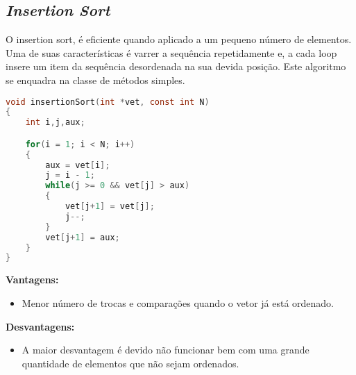 \documentclass[
	12pt,				%
	oneside,			%
	a4paper,			%
	english,			%
	brazil,				%
	]{article}
\begin{document}
\subsection{\textit{Insertion Sort}}
O insertion sort, é eficiente quando aplicado a um pequeno número de elementos. Uma de suas características é varrer a sequência repetidamente e, a cada 
loop insere um item da sequência desordenada na sua devida posição. Este algoritmo se enquadra na classe de métodos simples.\cite{Insertion}
\begin{lstlisting}[language=C, caption=Estrutura \textit{Insertion}]
void insertionSort(int *vet, const int N)
{
	int i,j,aux;

	for(i = 1; i < N; i++)
	{
		aux = vet[i];
		j = i - 1;
		while(j >= 0 && vet[j] > aux)
		{
			vet[j+1] = vet[j];
			j--;
		}
		vet[j+1] = aux;
	}
}
\end{lstlisting}
\textbf{Vantagens:}
\begin{itemize}
 \item Menor número de trocas e comparações quando o vetor já está ordenado.
\end{itemize}
\textbf{Desvantagens:}
\begin{itemize}
 \item A maior desvantagem é devido não funcionar bem com uma grande quantidade de elementos que não sejam ordenados.
\end{itemize}
\end{document}
